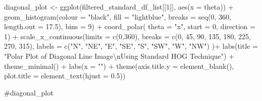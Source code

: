 \documentclass[
  letterpaper,
]{report}
\newenvironment{Shaded}{\begin{snugshade}}{\end{snugshade}}
\newcommand{\AttributeTok}[1]{\textcolor[rgb]{0.40,0.45,0.13}{#1}}
\newcommand{\CommentTok}[1]{\textcolor[rgb]{0.37,0.37,0.37}{#1}}
\newcommand{\DecValTok}[1]{\textcolor[rgb]{0.68,0.00,0.00}{#1}}
\newcommand{\FloatTok}[1]{\textcolor[rgb]{0.68,0.00,0.00}{#1}}
\newcommand{\FunctionTok}[1]{\textcolor[rgb]{0.28,0.35,0.67}{#1}}
\newcommand{\NormalTok}[1]{\textcolor[rgb]{0.00,0.23,0.31}{#1}}
\newcommand{\OtherTok}[1]{\textcolor[rgb]{0.00,0.23,0.31}{#1}}
\newcommand{\SpecialCharTok}[1]{\textcolor[rgb]{0.37,0.37,0.37}{#1}}
\newcommand{\StringTok}[1]{\textcolor[rgb]{0.13,0.47,0.30}{#1}}
\begin{document}
\begin{Shaded}
\begin{Highlighting}[]
\NormalTok{diagonal\_plot }\OtherTok{\textless{}{-}}
  \FunctionTok{ggplot}\NormalTok{(filtered\_standard\_df\_list[[}\DecValTok{1}\NormalTok{]], }
         \FunctionTok{aes}\NormalTok{(}\AttributeTok{x =}\NormalTok{ theta)) }\SpecialCharTok{+}
  \FunctionTok{geom\_histogram}\NormalTok{(}\AttributeTok{colour =} \StringTok{"black"}\NormalTok{, }
                 \AttributeTok{fill =} \StringTok{"lightblue"}\NormalTok{, }
                 \AttributeTok{breaks =} \FunctionTok{seq}\NormalTok{(}\DecValTok{0}\NormalTok{, }\DecValTok{360}\NormalTok{, }\AttributeTok{length.out =} \FloatTok{17.5}\NormalTok{),}
                 \AttributeTok{bins =} \DecValTok{9}\NormalTok{) }\SpecialCharTok{+}
  \FunctionTok{coord\_polar}\NormalTok{(}
    \AttributeTok{theta =} \StringTok{"x"}\NormalTok{, }
    \AttributeTok{start =} \DecValTok{0}\NormalTok{, }
    \AttributeTok{direction =} \DecValTok{1}\NormalTok{) }\SpecialCharTok{+}
  \FunctionTok{scale\_x\_continuous}\NormalTok{(}\AttributeTok{limits =} \FunctionTok{c}\NormalTok{(}\DecValTok{0}\NormalTok{,}\DecValTok{360}\NormalTok{),}
    \AttributeTok{breaks =} \FunctionTok{c}\NormalTok{(}\DecValTok{0}\NormalTok{, }\DecValTok{45}\NormalTok{, }\DecValTok{90}\NormalTok{, }\DecValTok{135}\NormalTok{, }\DecValTok{180}\NormalTok{, }\DecValTok{225}\NormalTok{, }\DecValTok{270}\NormalTok{, }\DecValTok{315}\NormalTok{), }
    \AttributeTok{labels =} \FunctionTok{c}\NormalTok{(}\StringTok{"N"}\NormalTok{, }\StringTok{"NE"}\NormalTok{, }\StringTok{"E"}\NormalTok{, }\StringTok{"SE"}\NormalTok{, }\StringTok{"S"}\NormalTok{, }\StringTok{"SW"}\NormalTok{, }\StringTok{"W"}\NormalTok{, }\StringTok{"NW"}\NormalTok{)}
\NormalTok{  )}\SpecialCharTok{+}
  \FunctionTok{labs}\NormalTok{(}\AttributeTok{title =} \StringTok{"Polar Plot of Diagonal Line Image}\SpecialCharTok{\textbackslash{}n}\StringTok{Using Standard HOG Technique"}\NormalTok{) }\SpecialCharTok{+}
  \FunctionTok{theme\_minimal}\NormalTok{() }\SpecialCharTok{+}
  \FunctionTok{labs}\NormalTok{(}\AttributeTok{x =} \StringTok{""}\NormalTok{) }\SpecialCharTok{+}
  \FunctionTok{theme}\NormalTok{(}\AttributeTok{axis.title.y =} \FunctionTok{element\_blank}\NormalTok{(),}
        \AttributeTok{plot.title =} \FunctionTok{element\_text}\NormalTok{(}\AttributeTok{hjust =} \FloatTok{0.5}\NormalTok{))}

\CommentTok{\#diagonal\_plot}
\end{Highlighting}
\end{Shaded}
\end{document}

